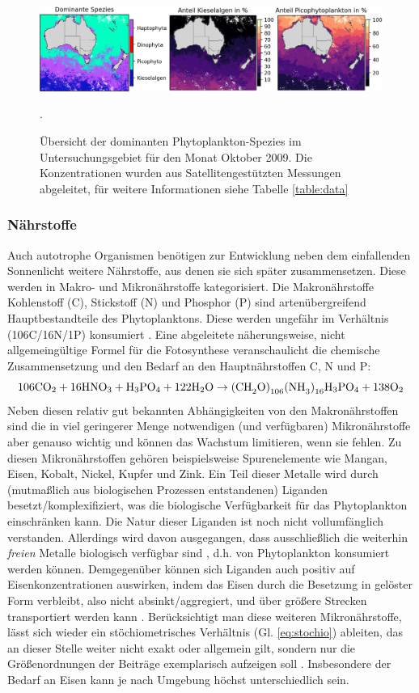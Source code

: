 \documentclass[12pt,a4paper,onecolumn]{scrartcl}
\newcommand{\cotwo}{CO\textsubscript{2}}
\begin{document}
\begin{figure}[!htb]
\includegraphics[width=\textwidth]{bilder/dominant_diatom_pico.png}
\caption{Übersicht der dominanten Phytoplankton-Spezies im Untersuchungsgebiet für den Monat Oktober 2009. Die Konzentrationen wurden aus Satellitengestützten Messungen abgeleitet, für weitere Informationen siehe Tabelle \ref{table:data}}. \label{fig:dominant_diatom_pico}
\end{figure}
\subsubsection{Nährstoffe} \label{sec:nährstoffe}
Auch autotrophe Organismen benötigen zur Entwicklung neben dem einfallenden Sonnenlicht weitere Nährstoffe, aus denen sie sich später zusammensetzen. Diese werden in Makro- und Mikronährstoffe kategorisiert. Die Makronährstoffe Kohlenstoff (C), Stickstoff (N) und Phosphor (P) sind artenübergreifend  Hauptbestandteile des Phytoplanktons. Diese werden ungefähr im Verhältnis (106C/16N/1P) konsumiert \citep{Falkowski.1998}. Eine abgeleitete näherungsweise, nicht allgemeingültige Formel für die Fotosynthese  \citep{Emerson.2009} veranschaulicht die chemische Zusammensetzung und den Bedarf an den Hauptnährstoffen C, N und P:
\begin{equation}
\text{106\cotwo} + \text{16HNO}_3 + \text{H}_3\text{PO}_4 + \text{122H}_2\text{O} \rightarrow \text{(CH}_2\text{O)}_{106}\text{(NH}_3\text{)}_{16}\text{H}_3\text{PO}_4 + \text{138O}_2
\end{equation}
Neben diesen relativ gut bekannten Abhängigkeiten von den Makronährstoffen sind die in viel geringerer Menge notwendigen (und verfügbaren) Mikronährstoffe aber genauso wichtig und können das Wachstum limitieren, wenn sie fehlen. Zu diesen Mikronährstoffen gehören beispielsweise Spurenelemente wie Mangan, Eisen, Kobalt, Nickel, Kupfer und Zink. Ein Teil dieser Metalle wird durch (mutmaßlich aus biologischen Prozessen entstandenen) Liganden besetzt/komplexifiziert, was die biologische Verfügbarkeit für das Phytoplankton einschränken kann. Die Natur dieser Liganden ist noch nicht vollumfänglich verstanden. Allerdings wird davon ausgegangen, dass ausschließlich die weiterhin \textit{freien} Metalle biologisch verfügbar sind \citep{Emerson.2009}, d.h. von Phytoplankton konsumiert werden können. Demgegenüber können sich Liganden auch positiv auf Eisenkonzentrationen auswirken, indem das Eisen durch die Besetzung in gelöster Form verbleibt, also nicht absinkt/aggregiert, und über größere Strecken transportiert werden kann \citep{Tagliabue.2017}. Berücksichtigt man diese weiteren Mikronährstoffe, lässt sich wieder ein stöchiometrisches Verhältnis (Gl. \ref{eq:stochio}) ableiten, das an dieser Stelle weiter nicht exakt oder allgemein gilt, sondern nur die Größenordnungen der Beiträge exemplarisch aufzeigen soll \citep{Emerson.2009}. Insbesondere der Bedarf an Eisen kann je nach Umgebung höchst unterschiedlich sein.
\end{document}
